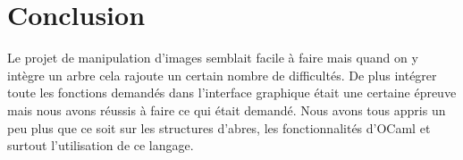 \documentclass[12pt]{article}
\begin{document}
\section*{Conclusion}
Le projet de manipulation d'images semblait facile à faire mais quand on y intègre un arbre cela rajoute un certain nombre de difficultés. De plus intégrer toute les fonctions demandés dans l'interface graphique était une certaine épreuve mais nous avons réussis à faire ce qui était demandé. Nous avons tous appris un peu plus que ce soit sur les structures d'abres, les fonctionnalités d'OCaml et surtout l'utilisation de ce langage. 
\end{document}

